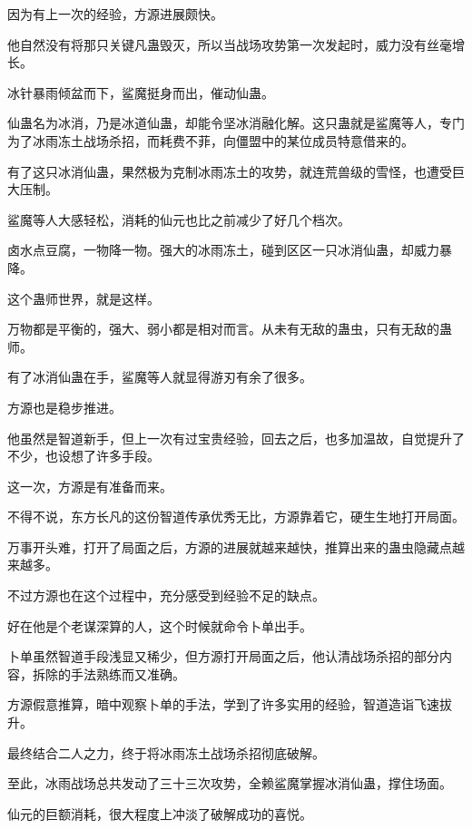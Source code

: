 \begin{this_body}
因为有上一次的经验，方源进展颇快。

他自然没有将那只关键凡蛊毁灭，所以当战场攻势第一次发起时，威力没有丝毫增长。

冰针暴雨倾盆而下，鲨魔挺身而出，催动仙蛊。

仙蛊名为冰消，乃是冰道仙蛊，却能令坚冰消融化解。这只蛊就是鲨魔等人，专门为了冰雨冻土战场杀招，而耗费不菲，向僵盟中的某位成员特意借来的。

有了这只冰消仙蛊，果然极为克制冰雨冻土的攻势，就连荒兽级的雪怪，也遭受巨大压制。

鲨魔等人大感轻松，消耗的仙元也比之前减少了好几个档次。

卤水点豆腐，一物降一物。强大的冰雨冻土，碰到区区一只冰消仙蛊，却威力暴降。

这个蛊师世界，就是这样。

万物都是平衡的，强大、弱小都是相对而言。从未有无敌的蛊虫，只有无敌的蛊师。

有了冰消仙蛊在手，鲨魔等人就显得游刃有余了很多。

方源也是稳步推进。

他虽然是智道新手，但上一次有过宝贵经验，回去之后，也多加温故，自觉提升了不少，也设想了许多手段。

这一次，方源是有准备而来。

不得不说，东方长凡的这份智道传承优秀无比，方源靠着它，硬生生地打开局面。

万事开头难，打开了局面之后，方源的进展就越来越快，推算出来的蛊虫隐藏点越来越多。

不过方源也在这个过程中，充分感受到经验不足的缺点。

好在他是个老谋深算的人，这个时候就命令卜单出手。

卜单虽然智道手段浅显又稀少，但方源打开局面之后，他认清战场杀招的部分内容，拆除的手法熟练而又准确。

方源假意推算，暗中观察卜单的手法，学到了许多实用的经验，智道造诣飞速拔升。

最终结合二人之力，终于将冰雨冻土战场杀招彻底破解。

至此，冰雨战场总共发动了三十三次攻势，全赖鲨魔掌握冰消仙蛊，撑住场面。

仙元的巨额消耗，很大程度上冲淡了破解成功的喜悦。

\end{this_body}

